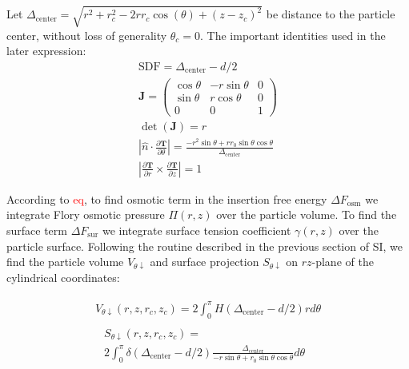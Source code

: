 \documentclass[10pt, a4paper]{article}
\newcommand\todo[1]{\textcolor{red}{#1}}
\begin{document}
\begin{multicols}{2}
Let $\Delta_{\textrm{center}} = \sqrt{r^2 + r_c^2 - 2 r r_c \cos(\theta) + (z-z_c)^2}$ be distance to the particle center, without loss of generality $\theta_c = 0$.
The important identities used in the later expression:
\begin{gather}
    \textrm{SDF} = \Delta_{\textrm{center}} - d/2
    \\
    \bm{J} = 
    \begin{pmatrix}
        \cos{\theta} & -r\sin\theta & 0 \\
        \sin{\theta} &  r\cos\theta & 0 \\
        0           & 0            & 1
    \end{pmatrix}\\
    \det(\bm{J}) = r \\
    \left| \hat{n} \cdot \frac{\partial \bm{T}}{\partial \theta} \right| = \frac{-r^2 \sin \theta + rr_0 \sin \theta \cos \theta}{\Delta_{\textrm{center}}}\\
    \left| \frac{\partial \bm{T}}{\partial r} \times \frac{\partial \bm{T}}{\partial z} \right| = 1
\end{gather}

According to \todo{eq}, to find osmotic term in the insertion free energy $\Delta F_{\textrm{osm}}$ we integrate Flory osmotic pressure $\Pi(r,z)$ over the particle volume.
To find the surface term $\Delta F_{\textrm{sur}}$ we integrate surface tension coefficient $\gamma(r,z)$ over the particle surface. 
Following the routine described in the previous section of SI, we find the particle volume $V_{\theta \downarrow}$ and surface projection $S_{\theta \downarrow}$ on $rz$-plane of the cylindrical coordinates:

\begin{gather}
    \begin{aligned}
        V_{\theta \downarrow}(r, z, r_c, z_c) = 2\int_{0}^{\pi} H\left(\Delta_{\textrm{center}} - d/2\right) r d\theta
    \end{aligned}\\
    \begin{aligned}
        &S_{\theta \downarrow}(r, z, r_c, z_c) = \\
        &2\int_{0}^{\pi} \delta \left(\Delta_{\textrm{center}} - d/2\right) \frac{\Delta_{\textrm{center}}}{-r \sin \theta + r_0 \sin \theta \cos \theta} d\theta
    \end{aligned}
\end{gather}


\end{multicols}
\end{document}
